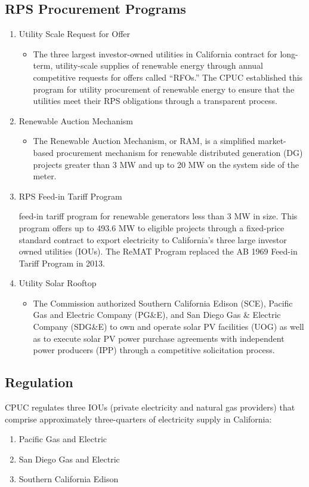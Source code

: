 \documentclass[11pt, oneside]{article}   	%
\begin{document}
\subsection{RPS Procurement Programs}
\begin{enumerate}
\item Utility Scale Request for Offer
\begin{itemize}
\item The three largest investor-owned utilities in California contract for long-term, utility-scale supplies of renewable energy through annual competitive requests for offers called “RFOs.” The CPUC established this program for utility procurement of renewable energy to ensure that the utilities meet their RPS obligations through a transparent process.
\end{itemize}
\item Renewable Auction Mechanism
\begin{itemize}
\item The Renewable Auction Mechanism, or RAM, is a simplified market-based procurement mechanism for renewable distributed generation (DG) projects greater than 3 MW and up to 20 MW on the system side of the meter.
\end{itemize}
\item RPS Feed-in Tariff Program 
\begin{itemize}
\itema feed-in tariff program for renewable generators less than 3 MW in size. This program offers up to 493.6 MW to eligible projects through a fixed-price standard contract to export electricity to California’s three large investor owned utilities (IOUs). The ReMAT Program replaced the AB 1969 Feed-in Tariff Program in 2013.
\end{itemize}
\item Utility Solar Rooftop
\begin{itemize}
\item The Commission authorized Southern California Edison (SCE), Pacific Gas and Electric Company (PG\&E), and San Diego Gas \& Electric Company (SDG\&E) to own and operate solar PV facilities (UOG) as well as to execute solar PV power purchase agreements with independent power producers (IPP) through a competitive solicitation process.
\end{itemize}
\end{enumerate}


\subsection{Regulation}
CPUC regulates three IOUs (private electricity and natural gas providers) that comprise approximately three-quarters of electricity supply in California:  
\begin{enumerate}
\item Pacific Gas and Electric
\item San Diego Gas and Electric
\item Southern California Edison 
\end{enumerate}
\end{document}
